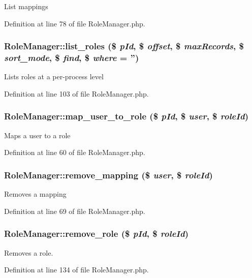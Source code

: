 List mappings 

Definition at line 78 of file Role\-Manager.php.
\subsubsection{\setlength{\rightskip}{0pt plus 5cm}Role\-Manager::list\_\-roles (\$ {\em p\-Id}, \$ {\em offset}, \$ {\em max\-Records}, \$ {\em sort\_\-mode}, \$ {\em find}, \$ {\em where} = '')}\label{classRoleManager_a7}


Lists roles at a per-process level 

Definition at line 103 of file Role\-Manager.php.
\subsubsection{\setlength{\rightskip}{0pt plus 5cm}Role\-Manager::map\_\-user\_\-to\_\-role (\$ {\em p\-Id}, \$ {\em user}, \$ {\em role\-Id})}\label{classRoleManager_a4}


Maps a user to a role 

Definition at line 60 of file Role\-Manager.php.
\subsubsection{\setlength{\rightskip}{0pt plus 5cm}Role\-Manager::remove\_\-mapping (\$ {\em user}, \$ {\em role\-Id})}\label{classRoleManager_a5}


Removes a mapping 

Definition at line 69 of file Role\-Manager.php.
\subsubsection{\setlength{\rightskip}{0pt plus 5cm}Role\-Manager::remove\_\-role (\$ {\em p\-Id}, \$ {\em role\-Id})}\label{classRoleManager_a8}


Removes a role. 

Definition at line 134 of file Role\-Manager.php.
